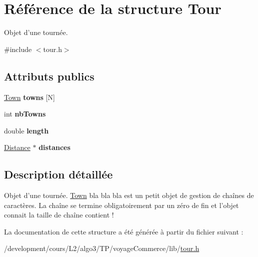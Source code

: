 \hypertarget{structTour}{
\section{Référence de la structure Tour}
\label{structTour}
}


Objet d'une tournée.  




{\ttfamily \#include $<$tour.h$>$}

\subsection*{Attributs publics}
\begin{DoxyCompactItemize}
\item 
\hypertarget{structTour_ab50c14f153f1a4b16788d31d9d845c69}{
\hyperlink{structTown}{Town} {\bfseries towns} \mbox{[}N\mbox{]}}
\label{structTour_ab50c14f153f1a4b16788d31d9d845c69}

\item 
\hypertarget{structTour_af54d0892d0de565850fdf26e98b90a03}{
int {\bfseries nbTowns}}
\label{structTour_af54d0892d0de565850fdf26e98b90a03}

\item 
\hypertarget{structTour_ad7ec8574d813b76140f78b035cdd93a9}{
double {\bfseries length}}
\label{structTour_ad7ec8574d813b76140f78b035cdd93a9}

\item 
\hypertarget{structTour_a4da8a499459d000a23d79af9d1a5565d}{
\hyperlink{structDistance}{Distance} $\ast$ {\bfseries distances}}
\label{structTour_a4da8a499459d000a23d79af9d1a5565d}

\end{DoxyCompactItemize}


\subsection{Description détaillée}
Objet d'une tournée. \hyperlink{structTown}{Town} bla bla bla est un petit objet de gestion de chaînes de caractères. La chaîne se termine obligatoirement par un zéro de fin et l'objet connait la taille de chaîne contient ! 

La documentation de cette structure a été générée à partir du fichier suivant :\begin{DoxyCompactItemize}
\item 
/development/cours/L2/algo3/TP/voyageCommerce/lib/\hyperlink{tour_8h}{tour.h}\end{DoxyCompactItemize}
